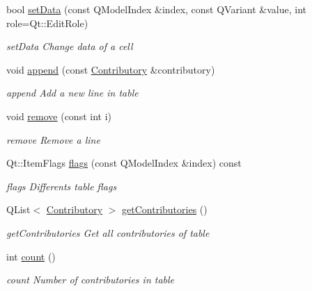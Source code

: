 \begin{DoxyCompactItemize}
bool \hyperlink{classGui_1_1Widgets_1_1WdgModels_1_1ContributoriesTableModel_a1c9f7969dc52e5840acfc122fcb2ab48}{set\+Data} (const Q\+Model\+Index \&index, const Q\+Variant \&value, int role=Qt\+::\+Edit\+Role)
\begin{DoxyCompactList}\small\item\em set\+Data Change data of a cell \end{DoxyCompactList}\item 
void \hyperlink{classGui_1_1Widgets_1_1WdgModels_1_1ContributoriesTableModel_a6d3f0ab976abd9993b731b27fbe3a404}{append} (const \hyperlink{classModels_1_1Contributory}{Contributory} \&contributory)
\begin{DoxyCompactList}\small\item\em append Add a new line in table \end{DoxyCompactList}\item 
void \hyperlink{classGui_1_1Widgets_1_1WdgModels_1_1ContributoriesTableModel_a76666bbbc940867b6ff3366424f72e26}{remove} (const int i)
\begin{DoxyCompactList}\small\item\em remove Remove a line \end{DoxyCompactList}\item 
Qt\+::\+Item\+Flags \hyperlink{classGui_1_1Widgets_1_1WdgModels_1_1ContributoriesTableModel_a6bf3e8c45bb499e82546be456a7de77b}{flags} (const Q\+Model\+Index \&index) const 
\begin{DoxyCompactList}\small\item\em flags Differents table flags \end{DoxyCompactList}\item 
Q\+List$<$ \hyperlink{classModels_1_1Contributory}{Contributory} $>$ \hyperlink{classGui_1_1Widgets_1_1WdgModels_1_1ContributoriesTableModel_af20bc21f24f7597b6b7d053d11d02d97}{get\+Contributories} ()
\begin{DoxyCompactList}\small\item\em get\+Contributories Get all contributories of table \end{DoxyCompactList}\item 
int \hyperlink{classGui_1_1Widgets_1_1WdgModels_1_1ContributoriesTableModel_acc01a97c00bb57e6733f697fc45be0ed}{count} ()
\begin{DoxyCompactList}\small\item\em count Number of contributories in table \end{DoxyCompactList}\end{DoxyCompactItemize}


